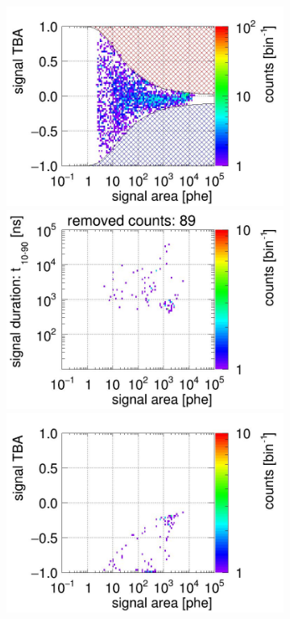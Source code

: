 \begin{landscape}
\begin{figure}[!p]
\begin{subfigure}[t]{0.33\textwidth}
			\includegraphics[width=\figurewidth,clip,trim={0 98 0 40}]{Figures/GasTest/CutsValid/res64767/tbapa08Vecfig64767.jpg}
			\includegraphics[width=\figurewidth,clip,trim={0 98 0 10}]{Figures/GasTest/CutsValid/res64767/pdpaX08Vecfig64767.jpg}
			\includegraphics[width=\figurewidth,clip,trim={0 0 0 40}]{Figures/GasTest/CutsValid/res64767/tbapaX08Vecfig64767.jpg}

\end{subfigure}
\end{figure}
\end{landscape}
